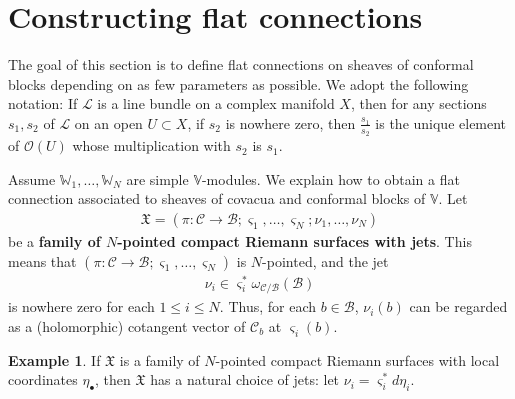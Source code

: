 \documentclass[12pt,b5paper,notitlepage]{report}
\theoremstyle{definition}
\newtheorem{eg}[df]{Example}
\theoremstyle{plain}
\newcommand{\fk}{\mathfrak}
\newcommand{\mc}{\mathcal}
\newcommand{\scr}{\mathscr}
\newcommand{\sgm}{\varsigma}
\newcommand{\blt}{\bullet}
\newcommand{\Vbb}{\mathbb V}
\newcommand{\Wbb}{\mathbb W}
\numberwithin{equation}{section}
\begin{document}
\section{Constructing flat connections}\label{lb146}


The goal of this section is to define flat connections on sheaves of conformal blocks depending on as few parameters as possible. We adopt the following notation: If $\scr L$ is a line bundle on a complex manifold $X$, then for any sections $s_1,s_2$ of $\scr L$ on an open $U\subset X$, if $s_2$ is nowhere zero, then $\frac {s_1}{s_2}$ is the unique element of $\scr O(U)$ whose multiplication with $s_2$ is $s_1$.

Assume $\Wbb_1,\dots,\Wbb_N$ are simple $\Vbb$-modules. We explain how to obtain a flat connection associated to sheaves of covacua and conformal blocks of $\Vbb$. Let
\begin{align*}
\fk X=(\pi:\mc C\rightarrow\mc B;\sgm_1,\dots,\sgm_N;\nu_1,\dots,\nu_N)
\end{align*}
be a \textbf{family of $N$-pointed compact Riemann surfaces with jets}. This means that $(\pi:\mc C\rightarrow\mc B;\sgm_1,\dots,\sgm_N)$ is $N$-pointed, and the jet
\begin{align*}
\nu_i\in\sgm_i^*\omega_{\mc C/\mc B}(\mc B)
\end{align*}
is nowhere zero for each $1\leq i\leq N$. Thus, for each $b\in\mc B$, $\nu_i(b)$ can be regarded as a (holomorphic) cotangent vector of $\mc C_b$ at $\sgm_i(b)$.




\begin{eg}
If $\fk X$ is a family of $N$-pointed compact Riemann surfaces with local coordinates $\eta_\blt$, then $\fk X$ has a natural choice of jets: let $\nu_i=\sgm_i^*d\eta_i$.
\end{eg}
\end{document}
